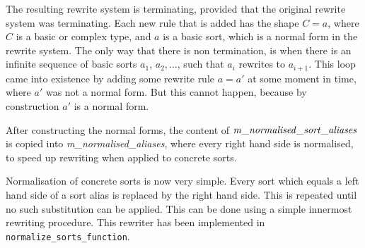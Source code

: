 \documentclass{article}
\begin{document}
The resulting rewrite system is terminating, provided that the original rewrite system
was terminating. Each new rule that is added has the shape $C = a$, where $C$ is
a basic or complex type, and $a$ is a basic sort, which is a normal form in the
rewrite system. The only way that there is non termination, is when there
is an infinite sequence of basic sorts $a_1$, $a_2,\ldots$, such that $a_i$ rewrites
to $a_{i+1}$. This loop came into existence by adding some rewrite rule $a=a'$ at
some moment in time, where $a'$ was not a normal form. But this cannot happen,
because by construction $a'$ is a normal form.

After constructing the normal forms, the content of ${\it m\_normalised\_sort\_aliases}$
is copied into {\it m\_normalised\_aliases}, where every right hand side is normalised,
to speed up rewriting when applied to concrete sorts.

Normalisation of concrete sorts is now very simple. Every sort which equals a
left hand side of a sort alias is replaced by the right hand side. This is repeated
until no such substitution can be applied. This can be done using a simple 
innermost rewriting procedure. This rewriter has been implemented in 
{\tt normalize\_sorts\_function}. 
\end{document}
